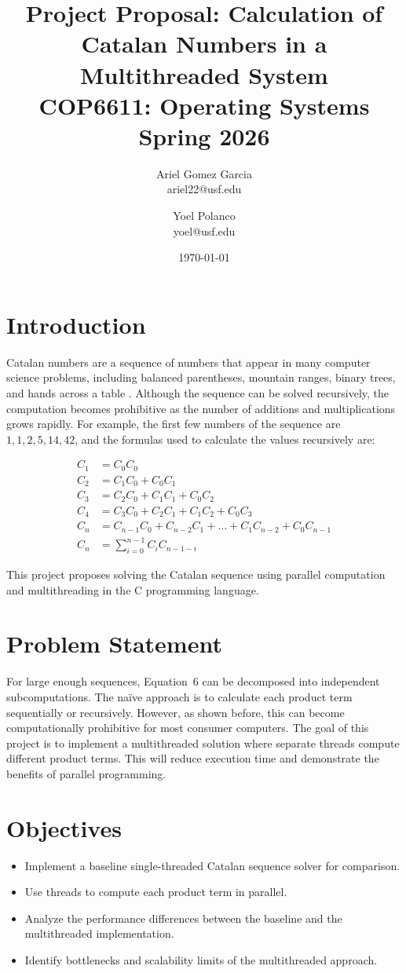 \documentclass[11pt]{article}
\title{Project Proposal: Calculation of Catalan Numbers in a Multithreaded System \\
\vspace{0.8cm}
\large COP6611: Operating Systems \\
Spring 2026}
\author{Ariel Gomez Garcia\\ ariel22@usf.edu \and
Yoel Polanco \\yoel@usf.edu }
\date{\today}
\begin{document}
\maketitle

\section{Introduction}
Catalan numbers are a sequence of numbers that appear in many computer science problems, including balanced parentheses, mountain ranges, binary trees, and hands across a table \citep{davis2006catalan}. Although the sequence can be solved recursively, the computation becomes prohibitive as the number of additions and multiplications grows rapidly. For example, the first few numbers of the sequence are $1, 1, 2, 5, 14, 42$, and the formulas used to calculate the values recursively are:

\begin{align}
C_1 &= C_0 C_0 \\
C_2 &= C_1 C_0 + C_0 C_1 \\
C_3 &= C_2 C_0 + C_1 C_1 + C_0 C_2 \\
C_4 &= C_3 C_0 + C_2 C_1 + C_1 C_2 + C_0 C_3 \\
C_n &= C_{n-1} C_0 + C_{n-2} C_1 + \dots + C_1 C_{n-2} + C_0 C_{n-1} \\
C_n &= \sum_{i=0}^{n-1} C_i C_{n-1-i}
\end{align}

This project proposes solving the Catalan sequence using parallel computation and multithreading in the C programming language.

\section{Problem Statement}
For large enough sequences, Equation~6 can be decomposed into independent subcomputations. The naïve approach is to calculate each product term sequentially or recursively. However, as shown before, this can become computationally prohibitive for most consumer computers. The goal of this project is to implement a multithreaded solution where separate threads compute different product terms. This will reduce execution time and demonstrate the benefits of parallel programming.

\section{Objectives}
\begin{itemize}
\item Implement a baseline single-threaded Catalan sequence solver for comparison.
\item Use threads to compute each product term in parallel.
\item Analyze the performance differences between the baseline and the multithreaded implementation.
\item Identify bottlenecks and scalability limits of the multithreaded approach.
\end{itemize}
\end{document}
